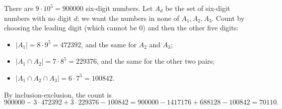 There are $9\cdot10^5=900000$ six-digit numbers. Let $A_d$ be the set of six-digit numbers with no digit $d$; we want the numbers in none of $A_1,A_2,A_3$. Count by choosing the leading digit (which cannot be $0$) and then the other five digits:
\begin{itemize}
\item $|A_1|=8\cdot9^5=472392$, and the same for $A_2$ and $A_3$;
\item $|A_1\cap A_2|=7\cdot8^5=229376$, and the same for the other two pairs;
\item $|A_1\cap A_2\cap A_3|=6\cdot7^5=100842$.
\end{itemize}
By inclusion-exclusion, the count is
\[900000-3\cdot472392+3\cdot229376-100842=900000-1417176+688128-100842=\boxed{70110}.\]
